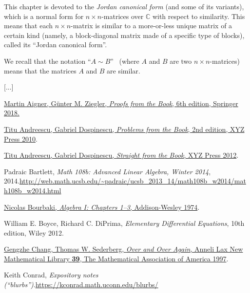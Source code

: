\documentclass[numbers=enddot,12pt,final,onecolumn,notitlepage]{scrartcl}%
\numberwithin{exer}{subsection}
\theoremstyle{definition}
\begin{document}
This chapter is devoted to the \emph{Jordan canonical form} (and some of its
variants), which is a normal form for $n\times n$-matrices over $\mathbb{C}$
with respect to similarity. This means that each $n\times n$-matrix is similar
to a more-or-less unique matrix of a certain kind (namely, a block-diagonal
matrix made of a specific type of blocks), called its \textquotedblleft Jordan
canonical form\textquotedblright.

We recall that the notation \textquotedblleft$A\sim B$\textquotedblright%
\ (where $A$ and $B$ are two $n\times n$-matrices) means that the matrices $A$
and $B$ are similar.

[...]

\newpage

\begin{thebibliography}{99999999}                                                                                         %


%
\href{https://doi.org/10.1007/978-3-662-57265-8}{Martin Aigner, G\"{u}nter M.
Ziegler, \textit{Proofs from the Book}, 6th edition, Springer 2018.}

\href{https://bookstore.ams.org/xyz-13}{Titu
Andreescu, Gabriel Dospinescu, \textit{Problems from the Book}, 2nd edition,
XYZ Press 2010}.

\href{https://bookstore.ams.org/xyz-6}{Titu
Andreescu, Gabriel Dospinescu, \textit{Straight from the Book}, XYZ Press
2012}.

Padraic Bartlett, \textit{Math 108b: Advanced
Linear Algebra, Winter 2014}, 2014.\newline\url{http://web.math.ucsb.edu/~padraic/ucsb_2013_14/math108b_w2014/math108b_w2014.html}

%
\href{http://libgen.rs/book/index.php?md5=3270565F6D0052635A1550883588204C}{Nicolas
Bourbaki, \textit{Algebra I: Chapters 1--3}, Addison-Wesley 1974}.

William E. Boyce, Richard C. DiPrima,
\textit{Elementary Differential Equations}, 10th edition, Wiley 2012.

%
\href{https://www.jstor.org/stable/10.4169/j.ctt19b9mbq}{Gengzhe Chang, Thomas
W. Sederberg, \textit{Over and Over Again}, Anneli Lax New Mathematical
Library \textbf{39}, The Mathematical Association of America 1997}.

Keith Conrad, \textit{Expository notes
(\textquotedblleft blurbs\textquotedblright)}.\newline\url{https://kconrad.math.uconn.edu/blurbs/}


\end{thebibliography}
\end{document}
